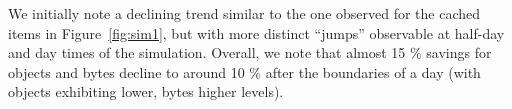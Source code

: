 \documentclass[letterpaper,conference]{IEEEtran}
\begin{document}
We initially note a declining trend similar to the one observed for the cached items in Figure~\ref{fig:sim1}, but with more distinct ``jumps'' observable at half-day and day times of the simulation.
Overall, we note that almost 15 \% savings for objects and bytes decline to around 10 \% after the boundaries of a day (with objects exhibiting lower, bytes higher levels).


%
\end{document}
